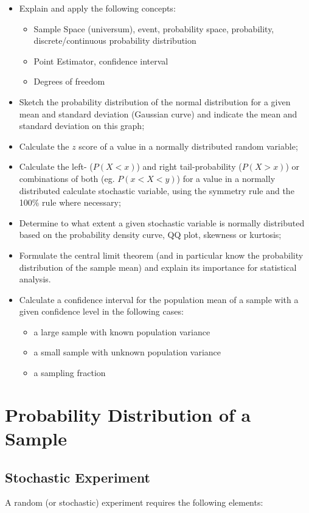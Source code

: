 \begin{itemize}
  \item Explain and apply the following concepts:
  \begin{itemize}
    \item Sample Space (universum), event, probability space, probability, discrete/continuous probability distribution
    \item Point Estimator, confidence interval
    \item Degrees of freedom
  \end{itemize}
  \item Sketch the probability distribution of the normal distribution for a given mean and standard deviation (Gaussian curve) and indicate the mean and standard deviation on this graph;
  \item Calculate the $z$ score of a value in a normally distributed random variable;
  \item Calculate the left- ($P(X<x)$) and right tail-probability ($P(X>x)$) or combinations of both (eg. $P(x<X<y)$) for a value in a normally distributed calculate stochastic variable, using the symmetry rule and the 100\% rule where necessary;
  \item Determine to what extent a given stochastic variable is normally distributed based on the probability density curve, QQ plot, skewness or kurtosis;
  \item Formulate the central limit theorem (and in particular know the probability distribution of the sample mean) and explain its importance for statistical analysis.
  \item Calculate a confidence interval for the population mean of a sample with a given confidence level in the following cases:
  \begin{itemize}
    \item a large sample with known population variance
    \item a small sample with unknown population variance
    \item a sampling fraction
  \end{itemize}
\end{itemize}

\section{Probability Distribution of a Sample}
\label{sec:probability-distribution-sample}

\subsection{Stochastic Experiment}
A random (or stochastic) experiment requires the following elements:

